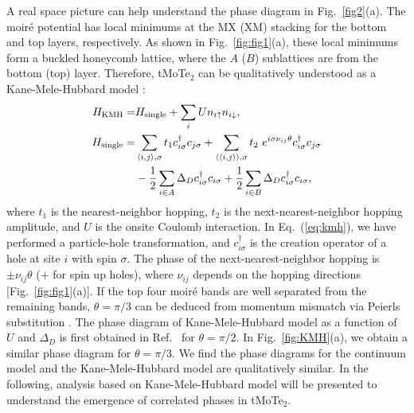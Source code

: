\documentclass[twocolumn,aps,prl,superscriptaddress]{revtex4-2}
\begin{document}
A real space picture can help understand the phase diagram in Fig.~\ref{fig2}(a). The moir\'e potential has local minimums at the MX (XM) stacking for the bottom and top layers, respectively. As shown in Fig.~\ref{fig:fig1}(a), these local minimums form a buckled honeycomb lattice, where the $A$ ($B$) sublattices are from the bottom (top) layer. Therefore, tMoTe$_2$ can be qualitatively understood as a Kane-Mele-Hubbard model \cite{kane2005quantum,kane2005z,hohenadler2011correlation,hohenadler2012quantum}:
\begin{equation}\label{eq:kmh}
\begin{aligned}
    H_{\rm KMH} = & H_{\rm single} + \sum_i U n_{i\uparrow} n_{i\downarrow}, \\
    H_{\rm single} = & \sum_{\langle i, j\rangle, \sigma} t_1 c_{i\sigma}^\dagger c_{j\sigma} + 
    \sum_{\langle\langle i, j \rangle\rangle, \sigma} t_2 ~ e^{i\sigma\nu_{ij}\theta} c_{i\sigma}^\dagger c_{j\sigma} \\
    & - \frac{1}{2}\sum_{i\in A} \Delta_D c_{i\sigma}^\dagger c_{i\sigma} + \frac{1}{2}\sum_{i\in B} \Delta_D c_{i\sigma}^\dagger c_{i\sigma},
\end{aligned}
\end{equation}
where $t_1$ is the nearest-neighbor hopping, $t_2$ is the next-nearest-neighbor hopping amplitude, and $U$ is the onsite Coulomb interaction. In Eq.~(\ref{eq:kmh}), we have performed a particle-hole transformation, and $c^\dagger_{i \sigma}$ is the creation operator of a hole at site $i$ with spin $\sigma$. The phase of the next-nearest-neighbor hopping is $\pm\nu_{ij}\theta$ ($+$ for spin up holes), where $\nu_{ij}$ depends on the hopping directions [Fig.~\ref{fig:fig1}(a)]. If the top four moir\'e bands are well separated from the remaining bands, $\theta = \pi/3$ can be deduced from momentum mismatch via Peierls substitution \cite{wu2019topological}. The phase diagram of Kane-Mele-Hubbard model as a function of $U$ and $\Delta_D$ is first obtained in Ref.~\cite{jiang2018antiferromagnetic} for $\theta=\pi / 2$. In Fig.~\ref{fig:KMH}(a), we obtain a similar phase diagram for $\theta=\pi / 3$. We find the phase diagrams for the continuum model and the Kane-Mele-Hubbard model are qualitatively similar. In the following, analysis based on Kane-Mele-Hubbard model will be presented to understand the emergence of correlated phases in tMoTe$_2$.
\end{document}
